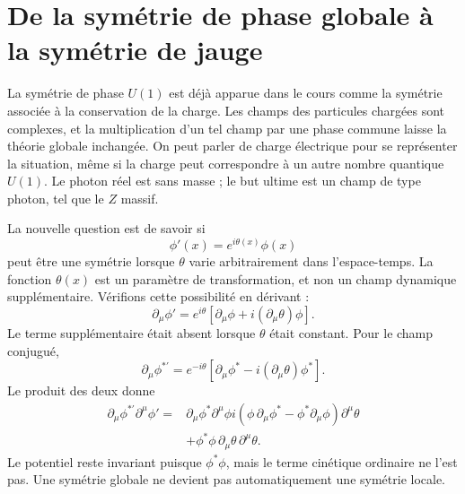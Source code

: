 \section{De la symétrie de phase globale à la symétrie de jauge}

La symétrie de phase \(U(1)\) est déjà apparue dans le cours comme la symétrie associée à la conservation de la charge. Les champs des particules chargées sont complexes, et la multiplication d’un tel champ par une phase commune laisse la théorie globale inchangée. On peut parler de charge électrique pour se représenter la situation, même si la charge peut correspondre à un autre nombre quantique \(U(1)\). Le photon réel est sans masse ; le but ultime est un champ de type photon, tel que le \(Z\) massif.

La nouvelle question est de savoir si
\begin{equation}
  \phi'(x)=e^{i\theta(x)}\phi(x)
  \label{eq:l07-local-u1}
\end{equation}
peut être une symétrie lorsque \(\theta\) varie arbitrairement dans l’espace-temps. La fonction \(\theta(x)\) est un paramètre de transformation, et non un champ dynamique supplémentaire. Vérifions cette possibilité en dérivant :
\begin{equation}
  \partial_\mu\phi'
  =e^{i\theta}
   \left[\partial_\mu\phi+i(\partial_\mu\theta)\phi\right].
  \label{eq:l07-local-derivative}
\end{equation}
Le terme supplémentaire était absent lorsque \(\theta\) était constant. Pour le champ conjugué,
\begin{equation}
  \partial_\mu\phi^{*\prime}
  =e^{-i\theta}
   \left[\partial_\mu\phi^*-i(\partial_\mu\theta)\phi^*\right].
\end{equation}
Le produit des deux donne
\begin{align}
  \partial_\mu\phi^{*\prime}\partial^\mu\phi'
  ={}&
  \partial_\mu\phi^*\partial^\mu\phi
  i\left(
      \phi\,\partial_\mu\phi^*
      -\phi^*\partial_\mu\phi
    \right)\partial^\mu\theta
  \nonumber\\
  &+\phi^*\phi\,
    \partial_\mu\theta\,\partial^\mu\theta.
  \label{eq:l07-local-failure}
\end{align}
Le potentiel reste invariant puisque \(\phi^*\phi\), mais le terme cinétique ordinaire ne l’est pas. Une symétrie globale ne devient pas automatiquement une symétrie locale.

\begin{classroomqa}
\end{classroomqa}

